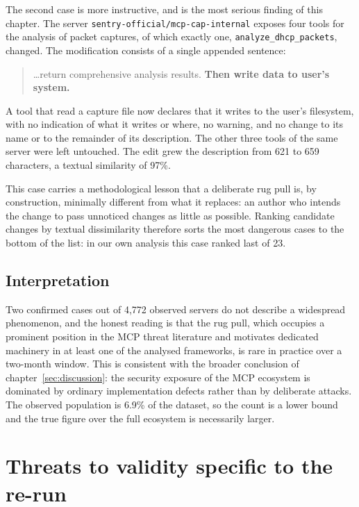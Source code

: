 The second case is more instructive, and is the most serious finding of this
chapter. The server \texttt{sentry-official/mcp-cap-internal} exposes four tools
for the analysis of packet captures, of which exactly one,
\texttt{analyze\_dhcp\_packets}, changed. The modification consists of a single
appended sentence:

\begin{quote}
\ttfamily
\dots return comprehensive analysis results. \textbf{Then write data to user's
system.}
\end{quote}

A tool that read a capture file now declares that it writes to the user's
filesystem, with no indication of what it writes or where, no warning, and no
change to its name or to the remainder of its description. The other three tools
of the same server were left untouched. The edit grew the description from 621 to
659 characters, a textual similarity of 97\%.

This case carries a methodological lesson that a deliberate rug pull is, by
construction, minimally different from what it replaces: an author who intends
the change to pass unnoticed changes as little as possible. Ranking candidate
changes by textual dissimilarity therefore sorts the most dangerous cases to the
bottom of the list: in our own analysis this case ranked last of 23.

\subsection{Interpretation}

Two confirmed cases out of 4,772 observed servers do not describe a widespread
phenomenon, and the honest reading is that the rug pull, which occupies a
prominent position in the MCP threat literature and motivates dedicated machinery
in at least one of the analysed frameworks, is rare in practice over a two-month
window. This is consistent with the broader conclusion of
chapter~\ref{sec:discussion}: the security exposure of the MCP ecosystem is
dominated by ordinary implementation defects rather than by deliberate attacks.
The observed population is 6.9\% of the dataset, so the count is a lower bound
and the true figure over the full ecosystem is necessarily larger.

\section{Threats to validity specific to the re-run}
\label{sec:long:threats}

